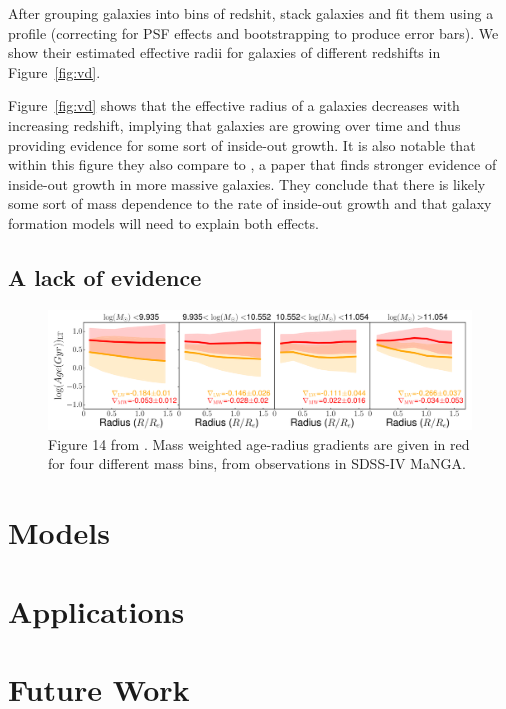 \documentclass[preprint2]{aastex631}
\begin{document}
After grouping galaxies into bins of redshit, \citet{vanDokkum+2013} stack galaxies and fit them using a \citet{Sersic+1968} profile (correcting for PSF effects and bootstrapping to produce error bars). We show their estimated effective radii for galaxies of different redshifts in Figure~\ref{fig:vd}.

Figure~\ref{fig:vd} shows that the effective radius of a galaxies decreases with increasing redshift, implying that galaxies are growing over time and thus providing evidence for some sort of inside-out growth. It is also notable that within this figure they also compare to \citet{Patel+2013}, a paper that finds stronger evidence of inside-out growth in more massive galaxies. They conclude that there is likely some sort of mass dependence to the rate of inside-out growth and that galaxy formation models will need to explain both effects.

\subsection{A lack of evidence}
\citep{Goddard+2017}

\begin{figure}[t]
    \centering
    \includegraphics[width=\textwidth]{goddard2017_fig14.png}
    \caption{Figure 14 from \citet{Goddard+2017}. Mass weighted age-radius gradients are given in red for four different mass bins, from observations in SDSS-IV MaNGA.}
\end{figure}

\section{Models}
\citep{Frankel+2019}

\section{Applications}
\citep{Banerjee+2020}

\section{Future Work}
\citep{Hogg+2019}
\end{document}
